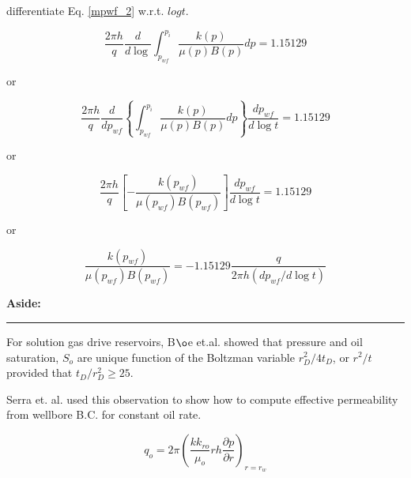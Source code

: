 \documentclass{llncs}
\numberwithin{equation}{section}
\numberwithin{figure}{section}
\numberwithin{table}{section}
\begin{document}
     differentiate Eq. \ref{mpwf_2} w.r.t. $logt$.
    
    \begin{equation}    
    \frac{2\pi h}{q}\frac{d}{d\log }\int_{{{p}_{wf}}}^{{{p}_{i}}}{\frac{k\left( p \right)}{\mu \left( p \right)B\left( p \right)}}dp=1.15129
        \label{semilog_slope}
    \end{equation}    
      
    or
    
    \begin{equation*}
        \frac{2\pi h}{q}\frac{d}{d{{p}_{wf}}}\left\{ \int_{{{p}_{wf}}}^{{{p}_{i}}}{\frac{k\left( p \right)}{\mu \left( p \right)B\left( p \right)}}dp \right\}\frac{d{{p}_{wf}}}{d\log t}=1.15129
    \end{equation*}  
     
    or
    
    \begin{equation*}
        \frac{2\pi h}{q}\left[ -\frac{k\left( {{p}_{wf}} \right)}{\mu \left( {{p}_{wf}} \right)B\left( {{p}_{wf}} \right)} \right]\frac{d{{p}_{wf}}}{d\log t}=1.15129
    \end{equation*}      
    
    or
    
    \begin{equation}
        \frac{k\left( {{p}_{wf}} \right)}{\mu \left( {{p}_{wf}} \right)B\left( {{p}_{wf}} \right)}=-\text{1}\text{.15129}\frac{q}{2\pi h\left( d{{p}_{wf}}/d\log t \right)}
        \label{semilog_slope2}
    \end{equation}    
    
    \vspace{15pt}
    \large{\textbf{Aside:}}\\
    \rule{\textwidth}{1pt}
    For solution gas drive reservoirs, B${\o}$e et.al.\cite{Boe_1989_1}  showed that pressure and oil saturation, $S_{o}$ are unique function of the Boltzman variable $r_{D}^{2}/4t_{D}$, or $r^{2}/t$ provided that $t_{D}/r_{D}^{2}\geq25$.
    
    Serra et. al. \cite{Serra_1990_1} used this observation to show how to compute effective permeability from wellbore B.C. for constant oil rate.
    
    \begin{equation}
        {{q}_{o}}=2\pi {{\left( \frac{k{{k}_{ro}}}{{{\mu }_{o}}}rh\frac{\partial p}{\partial r} \right)}_{r={{r}_{w}}}}
        \label{q_rw}
    \end{equation}     
    
\end{document}
